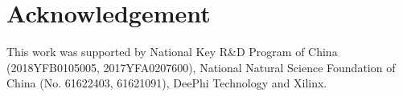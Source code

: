 \documentclass[acmsmall]{acmart}
\begin{document}
\maketitle

\renewcommand{\shortauthors}{K. Guo et al.}
\newcommand{\rev}[1]{{\color[rgb]{0,0,0}{#1}}}



















\section*{Acknowledgement}
This work was supported by National Key R\&D Program of China (2018YFB0105005, 2017YFA0207600), National Natural Science Foundation of China (No. 61622403, 61621091), DeePhi Technology and Xilinx.



\end{document}
